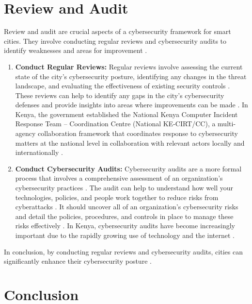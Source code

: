 \documentclass{article}
\begin{document}
\section{Review and Audit}
Review and audit are crucial aspects of a cybersecurity framework for smart cities. They involve conducting regular reviews and cybersecurity audits to identify weaknesses and areas for improvement \cite{riskoptics-2023} \cite{chimwanda-2022} \cite{miller-2023}.
\begin{enumerate}[label=\alph*)]
    \item \textbf{Conduct Regular Reviews:}  Regular reviews involve assessing the current state of the city’s cybersecurity posture, identifying any changes in the threat landscape, and evaluating the effectiveness of existing security controls\cite{riskoptics-2023} \cite{chimwanda-2022} \cite{miller-2023}. These reviews can help to identify any gaps in the city’s cybersecurity defenses and provide insights into areas where improvements can be made\cite{riskoptics-2023} \cite{chimwanda-2022} \cite{miller-2023}. In Kenya, the government established the National Kenya Computer Incident Response Team – Coordination Centre (National KE-CIRT/CC), a multi-agency collaboration framework that coordinates response to cybersecurity matters at the national level in collaboration with relevant actors locally and internationally \cite{the-national-kecirtcc-2022}.
    \item \textbf{Conduct Cybersecurity Audits:}  Cybersecurity audits are a more formal process that involves a comprehensive assessment of an organization’s cybersecurity practices\cite{riskoptics-2023} \cite{chimwanda-2022} \cite{miller-2023}. The audit can help to understand how well your technologies, policies, and people work together to reduce risks from cyberattacks \cite{riskoptics-2023}. It should uncover all of an organization’s cybersecurity risks and detail the policies, procedures, and controls in place to manage these risks effectively \cite{riskoptics-2023}. In Kenya, cybersecurity audits have become increasingly important due to the rapidly growing use of technology and the internet \cite{east-africa-hi-tech-solutions-2023}.
\end{enumerate}



In conclusion, by conducting regular reviews and cybersecurity audits, cities can significantly enhance their cybersecurity posture\cite{riskoptics-2023} \cite{chimwanda-2022} \cite{miller-2023}.

\section*{Conclusion}
\end{document}
